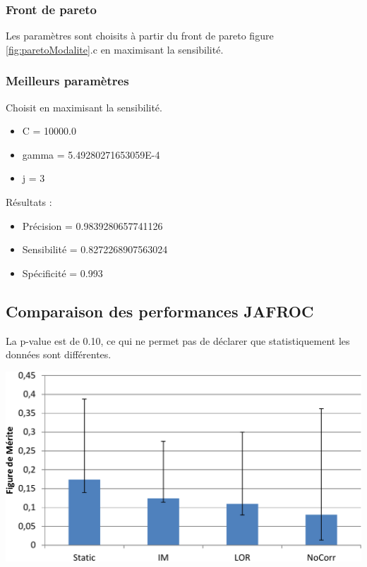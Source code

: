 \subsubsection{Front de pareto}

Les paramètres sont choisits à partir du front de pareto figure \ref{fig:paretoModalite}.c en maximisant la sensibilité.

\subsubsection{Meilleurs paramètres}

Choisit en maximisant la sensibilité.

\begin{itemize}
\item C = 10000.0
\item gamma = 5.49280271653059E-4
\item j = 3
\end{itemize}

Résultats :

\begin{itemize}
\item Précision = 0.9839280657741126
\item Sensibilité = 0.8272268907563024
\item Spécificité = 0.993
\end{itemize}


\subsection{Comparaison des performances JAFROC}

La p-value est de 0.10, ce qui ne permet pas de déclarer que statistiquement les données sont différentes.

\includegraphics[width=15cm]{images/FOM_mod}

